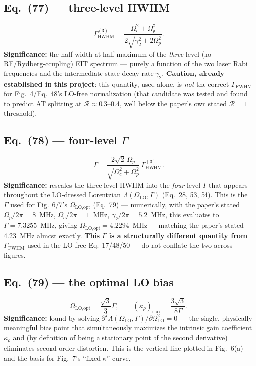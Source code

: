 \documentclass[11pt]{article}
\begin{document}
\subsection*{Eq.~(77) --- three-level HWHM}
\begin{equation}
\Gamma_\text{HWHM}^{(3)} = \frac{\Omega_c^2+\Omega_p^2}{2\sqrt{\gamma_2^2+2\Omega_p^2}}. \tag{77}
\end{equation}
\textbf{Significance:} the half-width at half-maximum of the
\emph{three}-level (no RF/Rydberg-coupling) EIT spectrum --- purely a
function of the two laser Rabi frequencies and the intermediate-state
decay rate $\gamma_2$. \textbf{Caution, already established in this
project}: this quantity, used alone, is \emph{not} the correct
$\Gamma_\text{FWHM}$ for Fig.~4/Eq.~48's LO-free normalization (that
candidate was tested and found to predict AT splitting at $\mathcal
R\approx0.3$--0.4, well below the paper's own stated $\mathcal R=1$
threshold).

\subsection*{Eq.~(78) --- four-level $\Gamma$}
\begin{equation}
\Gamma = \frac{2\sqrt2\,\Omega_p}{\sqrt{\Omega_c^2+\Omega_p^2}}\,\Gamma_\text{HWHM}^{(3)}. \tag{78}
\end{equation}
\textbf{Significance:} rescales the three-level HWHM into the
\emph{four}-level $\Gamma$ that appears throughout the LO-dressed
Lorentzian $\Lambda(\Omega_\text{LO},\Gamma)$ (Eq.~28, 53, 54). This is
the $\Gamma$ used for Fig.~6/7's $\Omega_\text{LO,opt}$ (Eq.~79) ---
numerically, with the paper's stated $\Omega_p/2\pi=8$~MHz,
$\Omega_c/2\pi=1$~MHz, $\gamma_2/2\pi=5.2$~MHz, this evaluates to
$\Gamma=7.3255$~MHz, giving $\Omega_\text{LO,opt}=4.2294$~MHz ---
matching the paper's stated 4.23~MHz almost exactly. \textbf{This
$\Gamma$ is a structurally different quantity from
$\Gamma_\text{FWHM}$} used in the LO-free Eq.~17/48/50 --- do not
conflate the two across figures.

\subsection*{Eq.~(79) --- the optimal LO bias}
\begin{equation}
\Omega_\text{LO,opt} = \frac{\sqrt3}{3}\Gamma, \qquad (\kappa_\rho)_\text{max}=\frac{3\sqrt3}{8\Gamma}. \tag{79}
\end{equation}
\textbf{Significance:} found by solving
$\partial^2\Lambda(\Omega_\text{LO},\Gamma)/\partial\Omega_\text{LO}^2=0$
--- the single, physically meaningful bias point that simultaneously
maximizes the intrinsic gain coefficient $\kappa_\rho$ and (by
definition of being a stationary point of the second derivative)
eliminates second-order distortion. This is the vertical line plotted
in Fig.~6(a) and the basis for Fig.~7's ``fixed $\kappa$'' curve.
\end{document}

